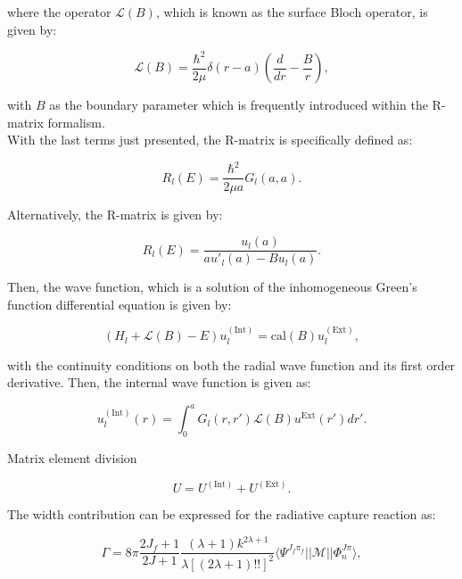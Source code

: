 \documentclass[openany]{book}
\begin{document}
where the operator $\mathcal{L}(B)$, which is known as the surface Bloch operator,  is given by:

\begin{equation}\label{rmatrix_Bloch_operator}
	\mathcal{L}(B) = \frac{\hbar^2}{2\mu} \delta(r - a) \left(\frac{d}{dr} - \frac{B}{r}\right),
\end{equation} 

with $B$ as the boundary parameter which is frequently introduced within the R-matrix formalism. \\

With the last terms just presented, the R-matrix is specifically defined as: 

\begin{equation}\label{rmatrix_Bloch_rmatrix}
	R_l(E) = \frac{\hbar^2}{2\mu a} G_l(a, a).
\end{equation} 

Alternatively, the R-matrix is given by:

\begin{equation}\label{rmatrix_u_rmatrix}
	R_l(E) =  \frac{u_l(a)}{au'_{l}(a) - Bu_l(a)}.
\end{equation} 

Then, the wave function, which is a solution of the inhomogeneous Green's function differential equation is given by:

\begin{equation}\label{rmatrix_BlochSchrodinger_inhomogeneous}
	(H_l + \mathcal{L}(B) - E)u^{\mathrm{(Int)}}_l = \mathrm{cal}(B) u^{\mathrm{(Ext)}}_l ,
\end{equation}

with the continuity conditions on both the radial wave function and its first order derivative. Then, the internal wave function is given as:

\begin{equation}\label{rmatrix_Bloch_internalWaveFunction}
	u^{(\mathrm{Int})}_l(r) = \int_{0}^{a} G_l(r, r') \mathcal{L}(B) u^{\mathrm{Ext}} (r') dr'.
\end{equation} 

Matrix element division

\begin{equation}\label{rmatrix_scatteringMatrix_division}
	U = U^{\mathrm{(Int)}} + U^{\mathrm{(Ext)}}.
\end{equation} 

The width contribution can be expressed for the radiative capture reaction as: 

\begin{equation}\label{rmatrix_radiativeCapture_width}
	\Gamma = 8\pi \frac{2J_f + 1}{2J + 1} \frac{(\lambda + 1)k^{2\lambda + 1}}{\lambda [(2\lambda + 1)!!]^2}  \langle \Psi^{J_f \pi_f} || \mathcal{M} || \Phi^{J\pi}_n \rangle,
\end{equation}
\end{document}
